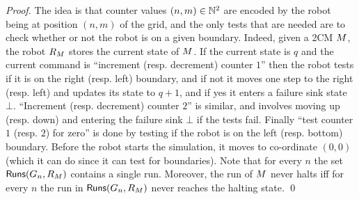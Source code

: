 
\begin{proof}
 The idea is that counter values $(n,m) \in \mathbb{N}^2$ are encoded by the robot being at position $(n,m)$ of the grid, and the only tests that are needed are to check whether or not the robot is on a given boundary. Indeed, given a 2CM $M$, the robot $R_{M}$ stores the current state of $M$. If the current state is $q$ and the current command is ``increment (resp. decrement) counter $1$'' then the robot tests if it is on the right (resp. left) boundary, and if not it moves one step to the right (resp. left) and updates its state to $q+1$, and if yes it enters a failure sink state $\bot$. ``Increment (resp. decrement) counter $2$'' is similar, and involves moving up (resp. down) and entering the failure sink $\bot$ if the tests fail. Finally ``test counter $1$ (resp. $2$) for zero'' is done by testing if the robot is on the left (resp. bottom) boundary. Before the robot starts the simulation, it moves to co-ordinate $(0,0)$ (which it can do since it can test for boundaries). Note that for every $n$ the set $\mathsf{Runs}(G_n,R_{M})$ contains a single run. Moreover, the run of $M$ never halts iff for every $n$ the run in $\mathsf{Runs}(G_n,R_{M})$ never reaches the halting state. \qed
\end{proof}


